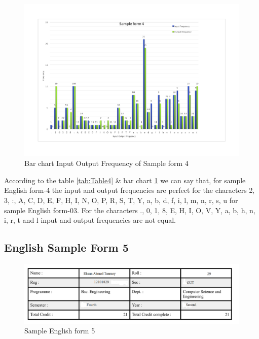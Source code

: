 \begin{figure}[H]
\centering
\includegraphics[width=1\textwidth]{form4.pdf}
\caption {Bar chart Input Output Frequency of Sample form 4}
\label {fig:bar4}
\end{figure}

According to the table \ref{tab:Table4} \& bar chart \ref{fig:bar4} we can say that, for sample English form-4 the input and output frequencies are perfect for the characters 2, 3, :, A, C, D, E, F, H, I, N, O, P, R, S, T, Y, a, b, d, f, i, l, m, n, r, s, u for sample English form-03. For the characters ., 0, 1, 8, E, H, I, O, V, Y, a, b, h, n, i, r, t and l input and output frequencies are not equal. 

\subsection{English Sample Form 5}
\begin{figure}[H]
\centering
\includegraphics[width=1\textwidth]{form5.png}
\caption {Sample English form 5}
\label {fig:form4}
\end{figure}

